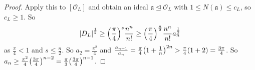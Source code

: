 \begin{proof}
    Apply this to \( [\mathcal O_L] \) and obtain an ideal \( \mathfrak a \trianglelefteq \mathcal O_L \) with \( 1 \leq N(\mathfrak a) \leq c_L \), so \( c_L \geq 1 \).
    So
    \[ \abs{D_L}^{\frac{1}{2}} \geq \qty(\frac{\pi}{4})^s \frac{n^n}{n!} \geq \qty(\frac{\pi}{4})^{\frac{n}{2}} \frac{n^n}{n!} a_n^{\frac{1}{2}} \]
    as \( \frac{\pi}{4} < 1 \) and \( s \leq \frac{n}{2} \).
    So \( a_2 = \frac{\pi^2}{4} \) and \( \frac{a_{n+1}}{a_n} = \frac{\pi}{4} \qty(1 + \frac{1}{n})^{2n} > \frac{\pi}{4}(1 + 2) = \frac{3\pi}{4} \).
    So \( a_n \geq \frac{\pi^2}{4} \qty(\frac{3\pi}{4})^{n-2} = \frac{\pi}{3} \qty(\frac{3\pi}{4})^{n-1} \).
\end{proof}
